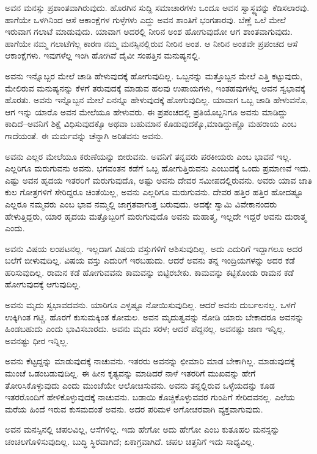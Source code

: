 ಅವನ ಮನಸ್ಸು ಪ್ರಶಾಂತವಾಗಿರುವುದು. ಹೊರಗಿನ ಸುದ್ದಿ ಸಮಾಚಾರಗಳು ಒಂದೂ ಅವನ ಸ್ವಾಸ್ಥ್ಯವನ್ನು ಕೆಡಿಸಲಾರವು. ಹಾಗೆಯೇ ಒಳಗಿನಿಂದ ಆಸೆ ಆಕಾಂಕ್ಷೆಗಳ ಗುಳ್ಳೆಗಳು ಎದ್ದು ಅವನ ಶಾಂತಿಗೆ ಭಂಗತಾರವು. ಬೆಣ್ಣೆ ಒಲೆ ಮೇಲೆ ಇರುವಾಗ ಗಲಾಟೆ ಮಾಡುವುದು. ಯಾವಾಗ ಅದರಲ್ಲಿ ನೀರಿನ ಅಂಶ ಹೋಗುವುದೋ ಆಗ ಶಾಂತವಾಗುವುದು. ಹಾಗೆಯೇ ನಮ್ಮ ಗಲಾಟೆಗೆಲ್ಲ ಕಾರಣ ನಮ್ಮ ಮನಸ್ಸಿನಲ್ಲಿರುವ ನೀರಿನ ಅಂಶ. ಆ ನೀರಿನ ಅಂಶವೇ ಪ್ರಪಂಚದ ಆಸೆ ಆಕಾಂಕ್ಷೆಗಳು. ಇವುಗಳೆಲ್ಲ ಇಂಗಿ ಹೋಗಿವೆ ದೈವೀ ಸಂಪತ್ತಿನ ಮನುಷ್ಯನಲ್ಲಿ.

ಅವನು ಇನ್ನೊಬ್ಬರ ಮೇಲೆ ಚಾಡಿ ಹೇಳುವುದಕ್ಕೆ ಹೋಗುವುದಿಲ್ಲ. ಒಬ್ಬನನ್ನು ಮತ್ತೊಬ್ಬನ ಮೇಲೆ ಎತ್ತಿ ಕಟ್ಟುವುದು, ಮೇಲಿರುವ ಮನುಷ್ಯನನ್ನು ಕೆಳಗೆ ತರುವುದಕ್ಕೆ ಮಾಡುವ ಹಲವು ಉಪಾಯಗಳು, ಇಂತಹವುಗಳೆಲ್ಲ ಅವನ ಸ್ವಭಾವಕ್ಕೆ ಹೊರತು. ಅವನು ಇನ್ನೊಬ್ಬನ ಮೇಲೆ ಏನನ್ನೂ ಹೇಳುವುದಕ್ಕೆ ಹೋಗುವುದಿಲ್ಲ. ಯಾವಾಗ ಒಬ್ಬ ಚಾಡಿ ಹೇಳುವನೊ, ಆಗ ಇನ್ನು ಯಾರೊ ಅವನ ಮೇಲೆಯೂ ಹೇಳುವರು. ಈ ಪ್ರಪಂಚದಲ್ಲಿ ಪ್ರತಿಯೊಬ್ಬನಿಗೂ ಅವನು ಮಾಡಿದ್ದು ಕಾದಿದೆ–ಅವನಿಗೆ ಶಿಕ್ಷೆ ವಿಧಿಸುವುದಕ್ಕೊ ಅಥವಾ ಬಹುಮಾನ ಕೊಡುವುದಕ್ಕೊ,\break ಮಾಡಿದ್ದುಣ್ಣೊ ಮಹರಾಯ ಎಂಬ ಗಾದೆಯಂತೆ. ಈ ಮರ್ಮವನ್ನು ಚೆನ್ನಾಗಿ ಅರಿತವನು ಅವನು.

ಅವನು ಎಲ್ಲರ ಮೇಲೆಯೂ ಕರುಣೆಯನ್ನು ಬೀರುವನು. ಅವನಿಗೆ ತನ್ನವರು ಪರಕೀಯರು ಎಂಬ ಭಾವನೆ ಇಲ್ಲ. ಎಲ್ಲರಿಗೂ ಮರುಗುವನು ಅವನು. ಭಗವಂತನ ಕಡೆಗೆ ಒಬ್ಬ ಹೋಗುತ್ತಿರು\-ವನು ಎಂಬುದಕ್ಕೆ ಒಂದು ಪ್ರಮಾಣವೆ ಇದು. ಎಷ್ಟು ಅವನ ಹೃದಯ ಇತರರಿಗೆ ಮರುಗುವುದೊ, ಅಷ್ಟು ಅವನು ದೇವರ ಸಮೀಪದಲ್ಲಿರುವನು. ಅವರು ಯಾವ ಜಾತಿ ಕುಲ ಗೋತ್ರಗಳಿಗೆ ಸೇರಿದ್ದರೂ ಚಿಂತೆಯಿಲ್ಲ, ಅವನು ಎಲ್ಲರಿಗೂ ಮರುಗುವನು. ದೇವರ ಹತ್ತಿರ ಹತ್ತಿರ ಹೋದಷ್ಟೂ ಎಲ್ಲರೂ ನಮ್ಮವರು ಎಂಬ ಭಾವ ನಮ್ಮಲ್ಲಿ ಜಾಗ್ರತವಾಗುತ್ತ ಬರುವುದು. ಅದಕ್ಕೇ ಸ್ವಾಮಿ ವಿವೇಕಾನಂದರು ಹೇಳುತ್ತಿದ್ದರು, ಯಾರ ಹೃದಯ ಮತ್ತೊಬ್ಬರಿಗೆ ಮರುಗುವುದೊ ಅವನು ಮಹಾತ್ಮ, ಇಲ್ಲದೇ ಇದ್ದರೆ ಅವನು ದುರಾತ್ಮ ಎಂದು.

ಅವನು ವಿಷಯ ಲಂಪಟನಲ್ಲ. ಇಲ್ಲದಾಗ ವಿಷಯ ವಸ್ತುಗಳಿಗೆ ಆಶಿಸುವುದಿಲ್ಲ. ಅದು ಎದುರಿಗೆ ಇದ್ದಾಗಲೂ ಅದರ ಬಲೆಗೆ ಬೀಳುವುದಿಲ್ಲ. ವಿಷಯ ವಸ್ತು ಎದುರಿಗೆ ಇರಬಹುದು. ಆದರೆ ಅವನು ತನ್ನ ಇಂದ್ರಿಯಗಳನ್ನು ಅದರ ಕಡೆ ಹರಿಸುವುದಿಲ್ಲ. ರಾಮನ ಕಡೆ ಹೋಗುವವನು ಕಾಮವನ್ನು ಬಿಟ್ಟಿರಬೇಕು. ಕಾಮವನ್ನು ಕಟ್ಟಿಕೊಂಡು ರಾಮನ ಕಡೆ ಹೋಗುವುದಕ್ಕೆ ಆಗುವುದಿಲ್ಲ.

ಅವನು ಮೃದು ಸ್ವಭಾವದವನು. ಯಾರಿಗೂ ಎಳ್ಳಷ್ಟೂ ನೋಯಿಸುವುದಿಲ್ಲ. ಆದರೆ ಅವನು ದುರ್ಬಲನಲ್ಲ. ಒಳಗೆ ಉಕ್ಕಿಗಿಂತ ಗಟ್ಚಿ. ಹೊರಗೆ ಕುಸುಮಕ್ಕಿಂತ ಕೋಮಲ. ಅವನ ಮೃದುತ್ವವನ್ನು ನೋಡಿ ಯಾರು ಬೇಕಾದರೂ ಅವನನ್ನು ಹಿಂಡಬಹುದು ಎಂದು ಭಾವಿಸಬಾರದು. ಅವನು ಮೃದು ಸರಳ; ಆದರೆ ಪೆದ್ದನಲ್ಲ. ಅವನಷ್ಟು ಜಾಣ ಇನ್ನಿಲ್ಲ. ಅವನಷ್ಟು ಧೀರ ಇನ್ನಿಲ್ಲ.

ಅವನು ಕೆಟ್ಟದ್ದನ್ನು ಮಾಡುವುದಕ್ಕೆ ನಾಚುವನು. ಇತರರು ಅವನನ್ನು ಛೀಮಾರಿ ಮಾಡ ಬೇಕಾಗಿಲ್ಲ. ಮಾಡುವುದಕ್ಕೆ ಮುಂಚೆ ಒಡಂಬಡುವುದಿಲ್ಲ. ಈ ಹೀನ ಕೃತ್ಯವನ್ನು ಮಾಡಿದರೆ ನಾಳೆ ಇತರರಿಗೆ ಮುಖವನ್ನು ಹೇಗೆ ತೋರಿಸಿಕೊಳ್ಳುವುದು ಎಂದು ಮುಂಚೆಯೇ ಆಲೋಚಿಸುವನು. ಅವನು ತನ್ನಲ್ಲಿರುವ ಒಳ್ಳೆಯದನ್ನು ಕೂಡ ಇತರರೊಂದಿಗೆ ಹೇಳಿಕೊಳ್ಳುವುದಕ್ಕೆ ನಾಚುವನು. ಬಡಾಯಿ ಕೊಚ್ಚಿಕೊಳ್ಳುವವರ ಗುಂಪಿಗೆ ಸೇರಿದವನಲ್ಲ. ಎಲೆಯ ಮರೆಯ ಹಿಂದೆ ಇರುವ ಕುಸಮದಂತೆ ಅವನು. ಅದರ ಪರಿಮಳ ಅಗೋಚರವಾಗಿ ವ್ಯಕ್ತವಾಗುವುದು.

ಅವನ ಮನಸ್ಸಿನಲ್ಲಿ ಚಪಲವಿಲ್ಲ, ಆಸೆಗಳಿಲ್ಲ. ಇದು ಹೇಗೋ ಅದು ಹೇಗೋ ಎಂಬ ಕುತೂಹಲ ಮನಸ್ಸನ್ನು ಚಂಚಲಗೊಳಿಸುವುದಿಲ್ಲ. ಬುದ್ಧಿ ಸ್ಥಿರವಾಗಿದೆ; ಏಕಾಗ್ರವಾಗಿದೆ. ಚಪಲ ಚಿತ್ತನಿಗೆ ಇದು ಸಾಧ್ಯವಿಲ್ಲ.

